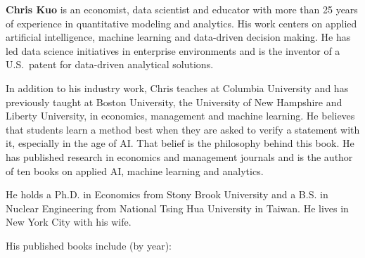 
\thispagestyle{empty}
\par
\vspace{1.5em}


\textbf{Chris Kuo} is an economist, data scientist and educator with more than 25 years of experience in quantitative modeling and analytics. 
His work centers on applied artificial intelligence, machine learning and data-driven decision making. He has led data science initiatives in enterprise environments
and is the inventor of a U.S.\ patent for data-driven analytical solutions.

In addition to his industry work, Chris teaches at Columbia University and has previously taught at Boston University, the University of New Hampshire and Liberty University, in economics, management and machine learning. He believes that students learn a method best when they are asked to verify a statement with it, especially in the age of AI. That belief is the philosophy behind this book.
He has published research in economics and management journals and is the author of ten books on applied AI, machine learning and analytics.

He holds a Ph.D. in Economics from Stony Brook University and a B.S. in Nuclear Engineering from National Tsing Hua University in Taiwan. He lives in New York City with his wife.

\medskip
\noindent His published books include (by year):

